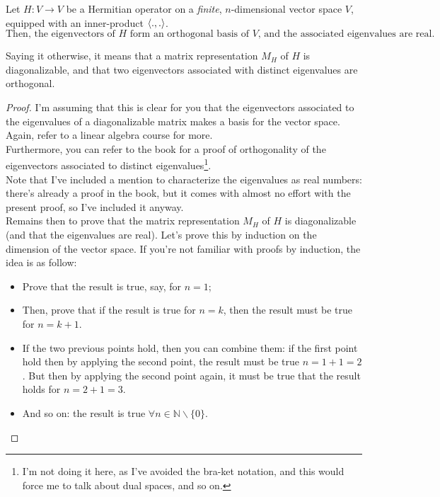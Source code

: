 \documentclass[solutions.tex]{subfiles}
\begin{document}
\begin{theorem} Let $H : V \rightarrow V$ be a Hermitian operator on a
\textit{finite}, $n$-dimensional vector space $V$, equipped with an
inner-product $\left\langle . , . \right\rangle$.
\[
	\boxed{\text{
		Then, the eigenvectors of $H$ form an orthogonal basis of $V$,
 and the associated eigenvalues are real.
	}}
\]

Saying it otherwise, it means that a matrix representation $M_H$ of $H$
is diagonalizable, and that two eigenvectors associated with distinct
eigenvalues are orthogonal.
\end{theorem}
\begin{proof} I'm assuming that this is clear for you that the eigenvectors
associated to the eigenvalues of a diagonalizable matrix makes
a basis for the vector space. Again, refer to a linear algebra course for
more. \\

Furthermore, you can refer to the book for a proof of orthogonality
of the eigenvectors associated to distinct eigenvalues\footnote{I'm
not doing it here, as I've avoided the bra-ket notation, and this
would force me to talk about dual spaces, and so on.}. \\

Note that I've included a mention to characterize the eigenvalues
as real numbers: there's already a proof in the book, but it
comes with almost no effort with the present proof, so I've
included it anyway. \\

Remains then to prove that the matrix representation $M_H$ of $H$ is
diagonalizable (and that the eigenvalues are real). Let's prove this
by induction on the dimension of the vector space. If you're not familiar
with proofs by induction, the idea is as follow:

\begin{itemize}
	\item Prove that the result is true, say, for $n=1$;
	\item Then, prove that if the result is true for $n=k$, then
	the result must be true for $n=k+1$.
	\item If the two previous points hold, then you can combine them:
	if the first point hold then by applying the second point, the
	result must be true $n=1+1=2$. But then by applying the second
	point again, it must be true that the result holds for $n=2+1=3$.
	\item And so on: the result is true $\forall n \in \mathbb{N}\backslash\{0\}$.
\end{itemize}


\end{proof}
\end{document}

